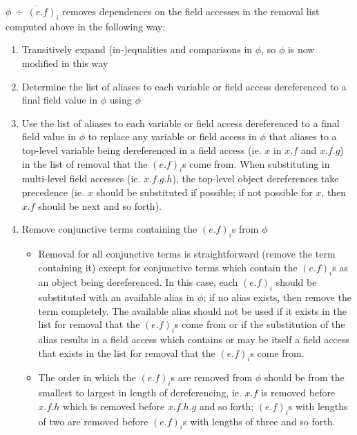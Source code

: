 \documentclass {article}
\newcommand{\fphi}{\widehat{\phi}}
\begin{document}
$\phi \overline{\ \div \ (e.f)_i}$ removes dependences on the field accesses in the removal list computed above in the following way:
\begin{enumerate}
\item Transitively expand (in-)equalities and comparisons in $\phi$, so $\phi$ is now modified in this way
\item Determine the list of aliases to each variable or field access dereferenced to a final field value in $\phi$ using $\phi$
\item Use the list of aliases to each variable or field access dereferenced to a final field value in $\phi$ to replace any variable or field access in $\phi$ that aliases to a top-level variable being dereferenced in a field access (ie. $x$ in $x.f$ and $x.f.g$) in the list of removal that the $(e.f)_i$s come from. When substituting in multi-level field accesses (ie. $x.f.g.h$), the top-level object dereferences take precedence (ie. $x$ should be substituted if possible; if not possible for $x$, then $x.f$ should be next and so forth).
\item Remove conjunctive terms containing the $(e.f)_i$s from $\phi$
	\begin{itemize}
	\item Removal for all conjunctive terms is straightforward (remove the term containing it) except for conjunctive terms which contain the $(e.f)_i$s as an object being dereferenced. In this case, each $(e.f)_i$ should be substituted with an available alias in $\phi$; if no alias exists, then remove the term completely. The available alias should not be used if it exists in the list for removal that the $(e.f)_i$s come from or if the substitution of the alias results in a field access which contains or may be itself a field access that exists in the list for removal that the $(e.f)_i$s come from.
	\item The order in which the $(e.f)_i$s are removed from $\phi$ should be from the smallest to largest in length of dereferencing, ie. $x.f$ is removed before $x.f.h$ which is removed before $x.f.h.g$ and so forth; $(e.f)_i$s with lengths of two are removed before $(e.f)_i$s with lengths of three and so forth.
	\end{itemize}
\end{enumerate}


\end{document}
